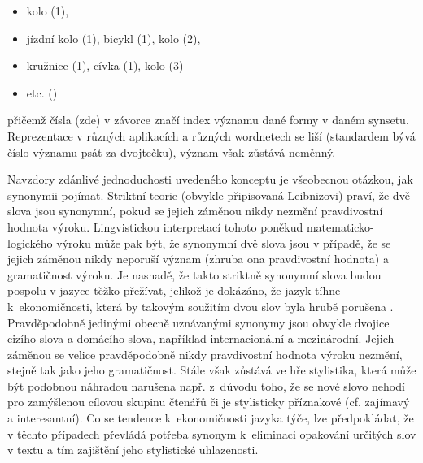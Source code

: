 \documentclass[a4paper, 11pt, oneside, showtrims]{book}
\newcommand\ex{\textsf}
\begin{document}
					\begin{itemize}
						\item \ex{kolo (1)},
						\item \ex{jízdní kolo (1), bicykl (1), kolo (2)},
						\item \ex{kružnice (1), cívka (1), kolo (3)}
						\item[] etc. (\textcite{pala2004building})
					\end{itemize}

					přičemž čísla (zde) v závorce značí index významu dané formy v daném synsetu. Reprezentace v různých aplikacích a různých wordnetech se liší (standardem bývá číslo významu psát za dvojtečku), význam však zůstává neměnný. 

					Navzdory zdánlivé jednoduchosti uvedeného konceptu je všeobecnou otázkou, jak synonymii pojímat. Striktní teorie (obvykle připisovaná Leibnizovi) praví, že dvě slova jsou synonymní, pokud se jejich záměnou nikdy nezmění pravdivostní hodnota výroku. Lingvistickou interpretací tohoto poněkud matematicko-logického výroku může pak být, že synonymní dvě slova jsou v případě, že se jejich záměnou nikdy neporuší význam (zhruba ona pravdivostní hodnota) a gramatičnost výroku. Je nasnadě, že takto striktně synonymní slova budou pospolu v jazyce těžko přežívat, jelikož je dokázáno, že jazyk tíhne k~ekonomičnosti, která by takovým soužitím dvou slov byla hrubě porušena \parencite{Lotko2003}. Pravděpodobně jedinými obecně uznávanými synonymy jsou obvykle dvojice cizího slova a domácího slova, například \ex{internacionální} a \ex{mezinárodní}. Jejich záměnou se velice pravděpodobně nikdy pravdivostní hodnota výroku nezmění, stejně tak jako jeho gramatičnost. Stále však zůstává ve hře stylistika, která může být podobnou náhradou narušena např. z~důvodu toho, že se nové slovo nehodí pro zamýšlenou cílovou skupinu čtenářů či je stylisticky příznakové (cf. \ex{zajímavý} a \ex{interesantní}). Co se tendence k~ekonomičnosti jazyka týče, lze předpokládat, že v těchto případech převládá potřeba synonym k~eliminaci opakování určitých slov v textu a tím zajištění jeho stylistické uhlazenosti. 
\end{document}
